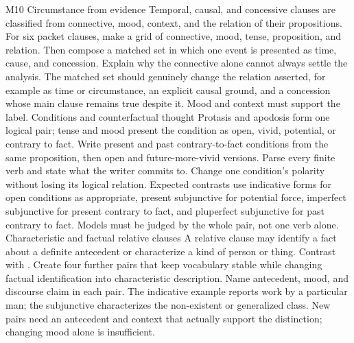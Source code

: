 \begin{courseunit}{M10}
\SubmoduleExtension
  {Circumstance from evidence}
  {Temporal, causal, and concessive clauses are classified from connective,
  mood, context, and the relation of their propositions.}
  {For six packet clauses, make a grid of connective, mood, tense, proposition,
  and relation.  Then compose a matched set in which one event is presented as
  time, cause, and concession.}
  {Explain why the connective alone cannot always settle the analysis.}
  {The matched set should genuinely change the relation asserted, for example
   as time or circumstance, an explicit causal ground, and
  a concession whose main clause remains true despite it.  Mood and context
  must support the label.}
\SubmoduleExtension
  {Conditions and counterfactual thought}
  {Protasis and apodosis form one logical pair; tense and mood present the
  condition as open, vivid, potential, or contrary to fact.}
  {Write present and past contrary-to-fact conditions from the same
  proposition, then open and future-more-vivid versions.  Parse every finite
  verb and state what the writer commits to.}
  {Change one condition's polarity without losing its logical relation.}
  {Expected contrasts use indicative forms for open conditions as appropriate,
  present subjunctive for potential force, imperfect subjunctive for present
  contrary to fact, and pluperfect subjunctive for past contrary to fact.
  Models must be judged by the whole pair, not one verb alone.}
\SubmoduleExtension
  {Characteristic and factual relative clauses}
  {A relative clause may identify a fact about a definite antecedent or
  characterize a kind of person or thing.}
  {Contrast  with .  Create four further pairs that keep vocabulary stable while
  changing factual identification into characteristic description.}
  {Name antecedent, mood, and discourse claim in each pair.}
  {The indicative example reports work by a particular man; the subjunctive
  characterizes the non-existent or generalized class.  New pairs need an
  antecedent and context that actually support the distinction; changing mood
  alone is insufficient.}
\end{courseunit}


